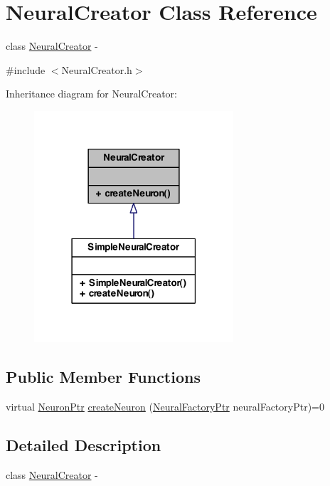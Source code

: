 \hypertarget{class_neural_creator}{
\section{NeuralCreator Class Reference}
\label{class_neural_creator}
}


class \hyperlink{class_neural_creator}{NeuralCreator} -\/  




{\ttfamily \#include $<$NeuralCreator.h$>$}



Inheritance diagram for NeuralCreator:\nopagebreak
\begin{figure}[H]
\begin{center}
\leavevmode
\includegraphics[width=210pt]{class_neural_creator__inherit__graph}
\end{center}
\end{figure}
\subsection*{Public Member Functions}
\begin{DoxyCompactItemize}
\item 
virtual \hyperlink{_a_m_o_r_e_8h_ac1ea936c2c7728eb382278131652fef4}{NeuronPtr} \hyperlink{class_neural_creator_abfff3986cb184e493107692eab3dc678}{createNeuron} (\hyperlink{_a_m_o_r_e_8h_ac4ad88962955479bfc426da9ce4571d2}{NeuralFactoryPtr} neuralFactoryPtr)=0
\end{DoxyCompactItemize}


\subsection{Detailed Description}
class \hyperlink{class_neural_creator}{NeuralCreator} -\/ 

